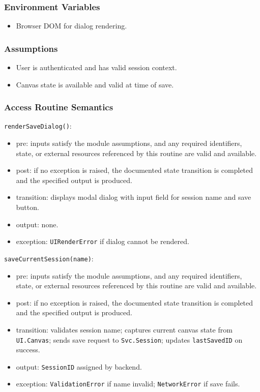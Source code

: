 \documentclass[12pt, titlepage]{article}
\begin{document}
\subsubsection{Environment Variables}
\begin{itemize}
    \item Browser DOM for dialog rendering.
\end{itemize}

\subsubsection{Assumptions}
\begin{itemize}
    \item User is authenticated and has valid session context.
    \item Canvas state is available and valid at time of save.
\end{itemize}

\subsubsection{Access Routine Semantics}

\noindent \texttt{renderSaveDialog()}:
\begin{itemize}
    \item pre: inputs satisfy the module assumptions, and any required identifiers, state, or external resources referenced by this routine are valid and available.
    \item post: if no exception is raised, the documented state transition is completed and the specified output is produced.
    \item transition: displays modal dialog with input field for session name and save button.
    \item output: none.
    \item exception: \texttt{UIRenderError} if dialog cannot be rendered.
\end{itemize}

\noindent \texttt{saveCurrentSession(name)}:
\begin{itemize}
    \item pre: inputs satisfy the module assumptions, and any required identifiers, state, or external resources referenced by this routine are valid and available.
    \item post: if no exception is raised, the documented state transition is completed and the specified output is produced.
    \item transition: validates session name; captures current canvas state from \texttt{UI.Canvas}; sends save request to \texttt{Svc.Session}; updates \texttt{lastSavedID} on success.
    \item output: \texttt{SessionID} assigned by backend.
    \item exception: \texttt{ValidationError} if name invalid; \texttt{NetworkError} if save fails.
\end{itemize}
\end{document}
